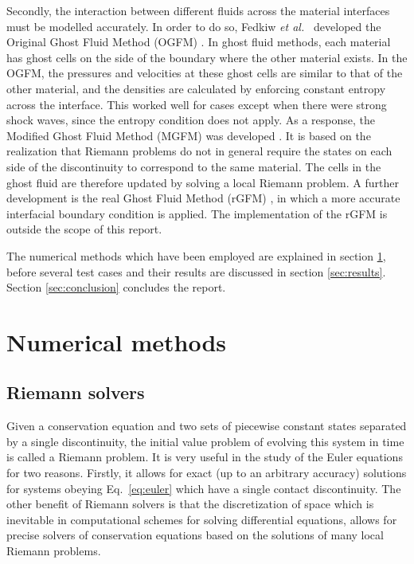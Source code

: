 \documentclass[final,3p,twocolumn]{elsarticle}
\begin{document}
Secondly, the interaction between different fluids across the material
interfaces must be modelled accurately. In order to do so, Fedkiw \emph{ et
al.\ } developed the Original Ghost Fluid Method (OGFM)
\cite{fedkiw1999nonoscillatory}. In ghost fluid methods, each material has
ghost cells on the side of the boundary where the other material exists. In the
OGFM, the pressures and velocities at these ghost cells are similar to that of
the other material, and the densities are calculated by enforcing constant
entropy across the interface. This worked well for cases except when there were
strong shock waves, since the entropy condition does not apply. As a response,
the Modified Ghost Fluid Method (MGFM) was developed \cite{liu2003ghost,
sambasivan2009ghost}. It is based on the realization that Riemann problems do
not in general require the states on each side of the discontinuity to
correspond to the same material. The cells in the ghost fluid are therefore
updated by solving a local Riemann problem. A further development is the real
Ghost Fluid Method (rGFM) \cite{wang2006real}, in which a more accurate
interfacial boundary condition is applied. The implementation of the rGFM is
outside the scope of this report. 

The numerical methods which have been employed are explained in section
\ref{sec:numerical}, before several test cases and their results are discussed
in section \ref{sec:results}. Section \ref{sec:conclusion} concludes the
report.

\section{Numerical methods}
\label{sec:numerical}

\subsection{Riemann solvers}
\label{subsec:riemann}

Given a conservation equation and two sets of piecewise constant states
separated by a single discontinuity, the initial value problem of evolving this
system in time is called a Riemann problem. It is very useful in the study of
the Euler equations for two reasons. Firstly, it allows for exact (up to an
arbitrary accuracy) solutions for systems obeying Eq.\  \eqref{eq:euler} which
have a single contact discontinuity. The other benefit of Riemann solvers is
that the discretization of space which is inevitable in computational schemes
for solving differential equations, allows for precise solvers of conservation
equations based on the solutions of many local Riemann problems. 
\end{document}
